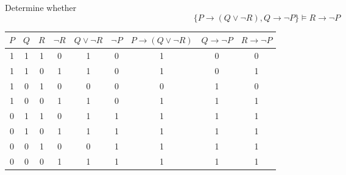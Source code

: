 \begin{exmp}
Determine whether $$\{P\to (Q\vee \neg R),Q\to \neg P\}\vDash R\to \neg P$$
\end{exmp} 

\begin{solution}

\begin{center}
\begin{tabular}{c|c|c|c|c|c|c|c|c}
    $P$ & $Q$ & $R$ & $\neg R$ & $Q\vee\neg R$ & $\neg P$ & $P\to (Q\vee\neg R)$ & $Q\to\neg P$ & $R\to\neg P$\\ \hline
    1 & 1 & 1 & 0 & 1 & 0 & 1 & 0 & 0 \\\hline
    1 & 1 & 0 & 1 & 1 & 0 & 1 & 0 & 1 \\\hline
    1 & 0 & 1 & 0 & 0 & 0 & 0 & 1 & 0 \\\hline
    1 & 0 & 0 & 1 & 1 & 0 & 1 & 1 & 1 \\\hline
    0 & 1 & 1 & 0 & 1 & 1 & 1 & 1 & 1 \\\hline
    0 & 1 & 0 & 1 & 1 & 1 & 1 & 1 & 1 \\\hline
    0 & 0 & 1 & 0 & 0 & 1 & 1 & 1 & 1 \\\hline
    0 & 0 & 0 & 1 & 1 & 1 & 1 & 1 & 1 \\
\end{tabular}
\end{center}
\end{solution}





